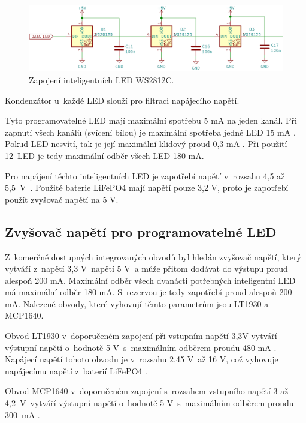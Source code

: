 \begin{figure}[!h]
  \begin{center}
    \includegraphics[scale=0.5]{obrazky/WS2812C.png}
  \end{center}
  \caption[Zapojení inteligentních LED WS2812C]{Zapojení inteligentních LED WS2812C.}
\end{figure}

Kondenzátor u~každé LED slouží pro filtraci napájecího napětí. 

Tyto programovatelné LED mají maximální spotřebu 5 mA na jeden kanál. Při zapnutí všech kanálů (svícení bílou) je maximální
spotřeba jedné LED 15 mA \cite{WS2812C_dtsh}. Pokud LED nesvítí, tak je její maximální klidový proud 0,3 mA \cite{WS2812C_dtsh}.
Při použití 12~LED je tedy maximální odběr všech LED 180 mA.

Pro napájení těchto inteligentních LED je zapotřebí napětí v~rozsahu 4,5 až 5,5~V~\cite{WS2812C_dtsh}. 
Použité baterie LiFePO4 mají napětí pouze 3,2 V, proto je zapotřebí použít zvyšovač napětí na 5 V. 

\subsection{Zvyšovač napětí pro programovatelné LED}
Z~komerčně dostupných integrovaných obvodů byl hledán zvyšovač napětí, který vytváří z~napětí 3,3 V~napětí 5 V~a může přitom dodávat do výstupu proud alespoň 200 mA. 
Maximální odběr všech dvanácti potřebných inteligentní LED má maximální odběr 180 mA. S~rezervou je tedy zapotřebí proud alespoň 200 mA. Nalezené obvody, které vyhovují 
těmto parametrům jsou LT1930 a MCP1640. 

Obvod LT1930 v~doporučeném zapojení při vstupním napětí 3,3V vytváří výstupní napětí o~hodnotě 5 V~s~maximálním odběrem proudu 480 mA \cite{LT1930_dtsh}. Napájecí napětí 
tohoto obvodu je v~rozsahu 2,45 V~až 16 V, což vyhovuje napájecímu napětí z~baterií LiFePO4 \cite{LT1930_dtsh}.

Obvod MCP1640 v~doporučeném zapojení s~rozsahem vstupního napětí 3 až 4,2~V~vytváří výstupní napětí o~hodnotě 5 V~s~maximálním odběrem proudu 300~mA \cite{MCP1640_dtsh}.

